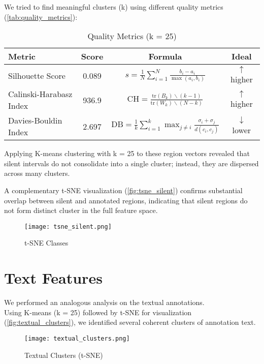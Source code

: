 \documentclass{article}
\begin{document}
We tried to find meaningful clusters (k) using different quality metrics (\autoref{tab:quality_metrics}):
\begin{table}[H]
  \centering
  \caption{Quality Metrics (k = 25)}
  \label{tab:quality_metrics}
  \begin{tabular}{@{} l c c c @{}} 
    \toprule
    Metric & Score & Formula & Ideal \\
    \midrule
    Silhouette Score & 0.089 & $s = \frac{1}{N}\sum_{i=1}^N \frac{b_i - a_i}{\max(a_i,b_i)}$ & $\uparrow$ higher \\
    Calinski-Harabasz Index & 936.9 & $\mathrm{CH} = \frac{\mathrm{tr}(B_k) \backslash (k - 1)}{\mathrm{tr}(W_k) \backslash (N - k)}$ & $\uparrow$ higher \\
    Davies-Bouldin Index & 2.697 & $\mathrm{DB} = \frac{1}{k}\sum_{i=1}^k \max_{j\neq i} \frac{\sigma_i + \sigma_j}{d(c_i,c_j)}$ & $\downarrow$ lower \\
    \bottomrule
  \end{tabular}
\end{table}

Applying K-means clustering with k = 25 to these region vectors revealed that silent intervals do not consolidate into a single cluster; instead, they are dispersed across many clusters. 

A complementary t-SNE visualization (\autoref{fig:tsne_silent}) confirms substantial overlap between silent and annotated regions, indicating that silent regions do not form distinct cluster in the full feature space.

\begin{figure}[H]
    \centering
    \texttt{[image: tsne\_silent.png]}
    \caption{t-SNE Classes}
    \label{fig:tsne_silent}
\end{figure}

\section{Text Features}
We performed an analogous analysis on the textual annotations. \\
Using K-means (k = 25) followed by t-SNE for visualization (\autoref{fig:textual_clusters}), we identified several coherent clusters of annotation text.

\begin{figure}[H]
    \centering
    \texttt{[image: textual\_clusters.png]}
    \caption{Textual Clusters (t-SNE)}
    \label{fig:textual_clusters}
\end{figure}
\end{document}
